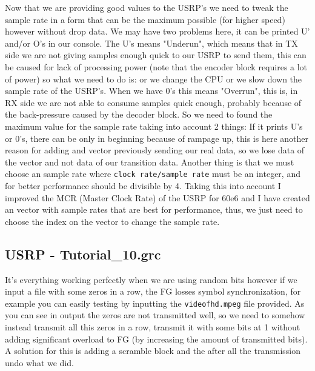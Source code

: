 \documentclass[a4paper, 10pt, conference]{ieeeconf}      %
\begin{document}
    Now that we are providing good values to the USRP's we need to tweak the sample rate in a form that can be the maximum possible (for higher speed) however without drop data. We may have two problems here, it can be printed U' and/or O's in our console. The U's means "Underun", which means that in TX side we are not giving samples enough quick to our USRP to send them, this can be caused for lack of processing power (note that the encoder block requires a lot of power) so what we need to do is: or we change the CPU or we slow down the sample rate of the USRP's. When we have 0's this means "Overrun", this is, in RX side we are not able to consume samples quick enough, probably because of the back-pressure caused by the decoder block. So we need to found the maximum value for the sample rate taking into account 2 things: If it prints U's or 0's, there can be only in beginning because of rampage up, this is here another reason for adding and vector previously sending our real data, so we lose data of the vector and not data of our transition data. Another thing is that we must choose an sample rate where \verb|clock rate/sample rate| must be an integer, and for better performance should be divisible by 4.
    Taking this into account I improved the MCR (Master Clock Rate) of the USRP for 60e6 and I have created an vector with sample rates that are best for performance, thus, we just need to choose the index on the vector to change the sample rate.
    
\subsection{USRP - Tutorial\_10.grc}
    It's everything working perfectly when we are using random bits however if we input a file with some zeros in a row, the FG losses symbol synchronization, for example you can easily testing by inputting the \verb|videofhd.mpeg| file provided. As you can see in output the zeros are not transmitted well, so we need to somehow instead transmit all this zeros in a row, transmit it with some bits at 1 without adding significant overload to FG (by increasing the amount of transmitted bits). A solution for this is adding a scramble block and the after all the transmission undo what we did.
    
\end{document}
